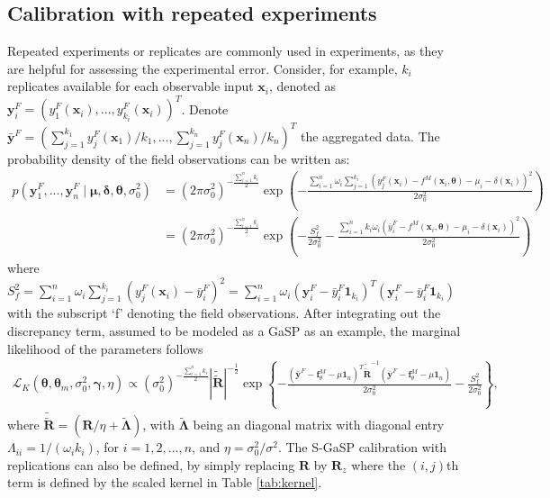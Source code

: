 \subsection{Calibration with repeated experiments}
Repeated experiments or replicates are commonly used in experiments, {as they are } helpful for assessing the experimental error. Consider, for example, $k_i$ replicates  available for each observable input $\mathbf x_i$, denoted as $\mathbf y^F_i=(y_1^F(\mathbf x_i),...,y^F_{k_i}(\mathbf x_i))^T$. Denote $\bar{\mathbf y}^F=(\sum^{k_1}_{j=1}y^F_{j}(\mathbf x_1)/k_1,...,\sum^{k_n}_{j=1}y^F_{j}(\mathbf x_n)/k_n)^T$ the aggregated data. The probability density of the field observations can be written as: 
\begin{align*}
p(\mathbf y^F_1,...,  \mathbf y^F_n \mid \bm \mu, \bm \delta, \bm \theta,  \sigma^2_0) &= (2\pi \sigma^2_0)^{-\frac{\sum^n_{i=1} k_i}{2}} \exp\left(-\frac{\sum^n_{i=1} \omega_i \sum^{k_i}_{j=1}  (y^F_j(\mathbf x_i)- f^M(\mathbf x_i,\bm \theta)-\mu_i-\delta(\mathbf x_i) )^2  }{2\sigma^2_0}\right) \\
&=   (2\pi\sigma^2_0)^{-\frac{\sum^n_{i=1} k_i}{2}} \exp\left(-\frac{ S^2_f }{2\sigma^2_0}- \frac{\sum^n_{i=1} k_i \omega_i ( \bar{ y}^F_i-f^M(\mathbf x_i,\bm \theta)-\mu_i-\delta(\mathbf x_i) )^2 }{2\sigma^2_0}\right)
\end{align*}
where $S^2_f=\sum^n_{i=1}\omega_i\sum^{k_i}_{j=1}   (y^F_j(\mathbf x_i)-\bar{ y}^F_i )^2=\sum^n_{i=1}{\omega_i(\mathbf y^F_i-\bar{ y}^F_i\mathbf 1_{k_i} )^T(\mathbf y^F_i-\bar{ y}^F_i \mathbf 1_{k_i}) }$ with the subscript `f' denoting the field observations. After integrating out the discrepancy term, assumed to be modeled as a GaSP as an example, the marginal likelihood of the parameters follows
\begin{align}
\mathcal L_K(\bm \theta, \bm \theta_m, \sigma^2_0, \bm \gamma,\eta )\propto (\sigma^2_0)^{-\frac{\sum^n_{i=1} k_i}{2} }| \tilde {\tilde {\bm R}}|^{-\frac{1}{2} }  \exp\left\{- \frac{(\bar{\mathbf y}^F-\mathbf f^M_{\theta}-\mu \mathbf 1_n )^T \tilde {\tilde {\bm R}}^{-1} (\bar{\mathbf y}^F- \mathbf f^M_{\theta}-\mu \mathbf 1_n)}{2 \sigma^2_0} -\frac{S^2_f}{2\sigma^2_0} \right\}, 
\label{equ:lik_replicates}
\end{align} %
where $\tilde {\tilde {\bm R}}= ( \mathbf R/\eta+  \tilde {\bm \Lambda})$, with $\tilde {\bm \Lambda}$ being an diagonal matrix with diagonal entry $\Lambda_{ii}=1/(\omega_ik_i)$, for $i=1,2,...,n$, and $\eta= \sigma^2_0/\sigma^2$. The S-GaSP calibration with replications can also be defined, by simply replacing $\mathbf R$ by $\mathbf R_z$ where the $(i,j)$th term is defined by the scaled kernel in Table \ref{tab:kernel}. 

